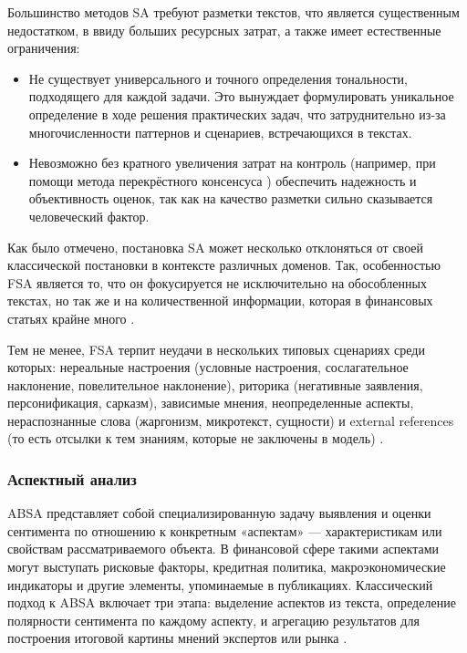 Большинство методов SA требуют разметки текстов, что является существенным недостатком, в ввиду больших ресурсных затрат,
а также имеет естественные ограничения:

\begin{itemize}
    \item Не существует универсального и точного определения тональности, подходящего для каждой задачи. Это вынуждает формулировать
    уникальное определение в ходе решения практических задач, что затруднительно из-за многочисленности паттернов
    и сценариев, встречающихся в текстах.
    \item Невозможно без кратного увеличения затрат на контроль (например, при помощи метода перекрёстного консенсуса
    \parencite{consensus1997bogdan}) обеспечить надежность и объективность оценок, так как на качество разметки
    сильно сказывается человеческий фактор.
\end{itemize}

Как было отмечено, постановка SA может несколько отклоняться от своей классической постановки в контексте различных доменов.
Так, особенностью FSA является то, что он фокусируется не исключительно на обособленных текстах, но так же и на количественной
информации, которая в финансовых статьях крайне много \parencite{FSA2024techniques}.

Тем не менее, FSA терпит неудачи в нескольких типовых сценариях среди которых: нереальные настроения (условные настроения,
сослагательное наклонение, повелительное наклонение), риторика (негативные заявления, персонификация, сарказм), зависимые
мнения, неопределенные аспекты, нераспознанные слова (жаргонизм, микротекст, сущности) и external references (то есть
отсылки к тем знаниям, которые не заключены в модель) \parencite{FSA2020problems}.

\subsubsection{Аспектный анализ}
\label{sec:absa}
ABSA представляет собой специализированную задачу выявления и оценки сентимента по отношению к конкретным
«аспектам» --- характеристикам или свойствам рассматриваемого объекта. В финансовой сфере такими аспектами
могут выступать рисковые факторы, кредитная политика, макроэкономические индикаторы и другие элементы,
упоминаемые в публикациях. Классический подход к ABSA включает три этапа: выделение аспектов из текста,
определение полярности сентимента по каждому аспекту, и агрегацию результатов для построения итоговой
картины мнений экспертов или рынка .

